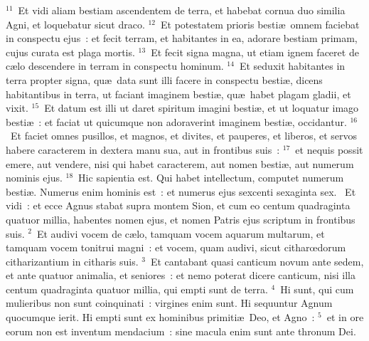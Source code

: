 ${}^{11}$~Et vidi aliam bestiam ascendentem de terra, et habebat cornua duo similia Agni, et loquebatur sicut draco.
${}^{12}$~Et potestatem prioris besti\ae\ omnem faciebat in conspectu ejus~: et fecit terram, et habitantes in ea, adorare bestiam primam, cujus curata est plaga mortis.
${}^{13}$~Et fecit signa magna, ut etiam ignem faceret de c\ae lo descendere in terram in conspectu hominum.
${}^{14}$~Et seduxit habitantes in terra propter signa, qu\ae\ data sunt illi facere in conspectu besti\ae , dicens habitantibus in terra, ut faciant imaginem besti\ae , qu\ae\ habet plagam gladii, et vixit.
${}^{15}$~Et datum est illi ut daret spiritum imagini besti\ae , et ut loquatur imago besti\ae~: et faciat ut quicumque non adoraverint imaginem besti\ae , occidantur.
${}^{16}$~Et faciet omnes pusillos, et magnos, et divites, et pauperes, et liberos, et servos habere caracterem in dextera manu sua, aut in frontibus suis~:
${}^{17}$~et nequis possit emere, aut vendere, nisi qui habet caracterem, aut nomen besti\ae , aut numerum nominis ejus.
${}^{18}$~Hic sapientia est. Qui habet intellectum, computet numerum besti\ae . Numerus enim hominis est~: et numerus ejus sexcenti sexaginta sex.
~\lettrine[lines=10,image=true,loversize=0.05,lraise=-0.03]{E}{}t vidi~: et ecce Agnus stabat supra montem Sion, et cum eo centum quadraginta quatuor millia, habentes nomen ejus, et nomen Patris ejus scriptum in frontibus suis.
${}^{2}$~Et audivi vocem de c\ae lo, tamquam vocem aquarum multarum, et tamquam vocem tonitrui magni~: et vocem, quam audivi, sicut citharœdorum citharizantium in citharis suis.
${}^{3}$~Et cantabant quasi canticum novum ante sedem, et ante quatuor animalia, et seniores~: et nemo poterat dicere canticum, nisi illa centum quadraginta quatuor millia, qui empti sunt de terra.
${}^{4}$~Hi sunt, qui cum mulieribus non sunt coinquinati~: virgines enim sunt. Hi sequuntur Agnum quocumque ierit. Hi empti sunt ex hominibus primiti\ae\ Deo, et Agno~:
${}^{5}$~et in ore eorum non est inventum mendacium~: sine macula enim sunt ante thronum Dei.


